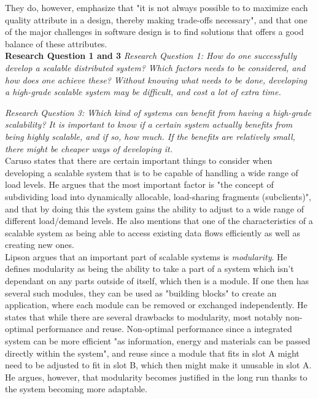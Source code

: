 \documentclass{article}
\begin{document}
{They do, however, emphasize that "it is not always possible to to maximize
each quality attribute in a design, thereby making trade-offs necessary", and
that one of the major challenges in software design is to find solutions that
offers a good balance of these attributes.
\\

\noindent\textbf{Research Question 1 and 3}
{\scriptsize \emph{Research Question 1: How do one successfully develop a
scalable distributed system? Which factors needs to be considered, and how does
one achieve these? Without knowing what needs to be done, developing a
high-grade scalable system may be difficult, and cost a lot of extra time.}}

{\scriptsize \emph{Research Question 3: Which kind of systems can benefit from
having a high-grade scalability? It is important to know if a certain system
actually benefits from being highly scalable, and if so, how much. If the
benefits are relatively small, there might be cheaper ways of developing it.}}
\\

Caruso \cite{caruso1997toward} states that there are certain important things
to consider when developing a scalable system that is to be capable of handling
a wide range of load levels. He argues that the most important factor is "the
concept of subdividing load into dynamically allocable, load-sharing fragments
(subclients)", and that by doing this the system gains the ability to adjust to
a wide range of different load/demand levels.
He also mentions that one of the characteristics of a scalable system as being
able to access existing data flows efficiently as well as creating new ones.
\\

Lipson \cite{lipson2007principles} argues that an important part of scalable
systems is \emph{modularity}. He defines modularity as being the ability to
take a part of a system which isn't dependant on any parts outside of itself,
which then is a module. If one then has several such modules, they can be used
as "building blocks" to create an application, where each module can be removed
or exchanged independently.  He states that while there are several drawbacks
to modularity, most notably non-optimal performance and reuse.  Non-optimal
performance since a integrated system can be more efficient "as information,
energy and materials can be passed directly within the system", and reuse since
 a module that fits in slot A might need to be adjusted to fit in slot B,
which then might make it unusable in slot A. He argues, however, that
modularity becomes justified in the long run thanks to the system becoming more
adaptable.
\\

}
\end{document}
